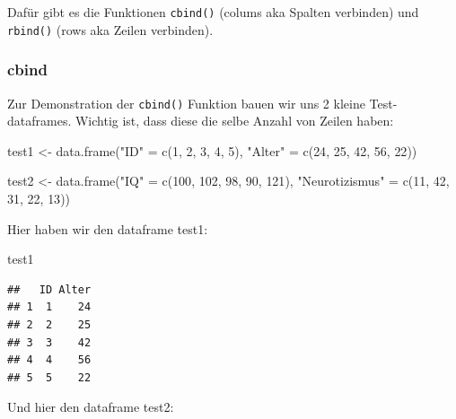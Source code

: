 \documentclass[
]{book}
\newenvironment{Shaded}{\begin{snugshade}}{\end{snugshade}}
\newcommand{\DecValTok}[1]{\textcolor[rgb]{0.00,0.00,0.81}{#1}}
\newcommand{\FunctionTok}[1]{\textcolor[rgb]{0.00,0.00,0.00}{#1}}
\newcommand{\NormalTok}[1]{#1}
\newcommand{\OtherTok}[1]{\textcolor[rgb]{0.56,0.35,0.01}{#1}}
\newcommand{\StringTok}[1]{\textcolor[rgb]{0.31,0.60,0.02}{#1}}
\begin{document}
Dafür gibt es die Funktionen \texttt{cbind()} (colums aka Spalten verbinden) und \texttt{rbind()} (rows aka Zeilen verbinden).

\hypertarget{cbind}{%
\subsubsection{cbind}\label{cbind}}

Zur Demonstration der \texttt{cbind()} Funktion bauen wir uns 2 kleine Test-dataframes. Wichtig ist, dass diese die selbe Anzahl von Zeilen haben:

\begin{Shaded}
\begin{Highlighting}[]
\NormalTok{test1 }\OtherTok{\textless{}{-}} \FunctionTok{data.frame}\NormalTok{(}\StringTok{"ID"} \OtherTok{=} \FunctionTok{c}\NormalTok{(}\DecValTok{1}\NormalTok{, }\DecValTok{2}\NormalTok{, }\DecValTok{3}\NormalTok{, }\DecValTok{4}\NormalTok{, }\DecValTok{5}\NormalTok{),}
                     \StringTok{"Alter"} \OtherTok{=} \FunctionTok{c}\NormalTok{(}\DecValTok{24}\NormalTok{, }\DecValTok{25}\NormalTok{, }\DecValTok{42}\NormalTok{, }\DecValTok{56}\NormalTok{, }\DecValTok{22}\NormalTok{))}

\NormalTok{test2 }\OtherTok{\textless{}{-}} \FunctionTok{data.frame}\NormalTok{(}\StringTok{"IQ"} \OtherTok{=} \FunctionTok{c}\NormalTok{(}\DecValTok{100}\NormalTok{, }\DecValTok{102}\NormalTok{, }\DecValTok{98}\NormalTok{, }\DecValTok{90}\NormalTok{, }\DecValTok{121}\NormalTok{),}
                     \StringTok{"Neurotizismus"} \OtherTok{=} \FunctionTok{c}\NormalTok{(}\DecValTok{11}\NormalTok{, }\DecValTok{42}\NormalTok{, }\DecValTok{31}\NormalTok{, }\DecValTok{22}\NormalTok{, }\DecValTok{13}\NormalTok{))}
\end{Highlighting}
\end{Shaded}

Hier haben wir den dataframe test1:

\begin{Shaded}
\begin{Highlighting}[]
\NormalTok{test1}
\end{Highlighting}
\end{Shaded}

\begin{verbatim}
##   ID Alter
## 1  1    24
## 2  2    25
## 3  3    42
## 4  4    56
## 5  5    22
\end{verbatim}

Und hier den dataframe test2:
\end{document}
